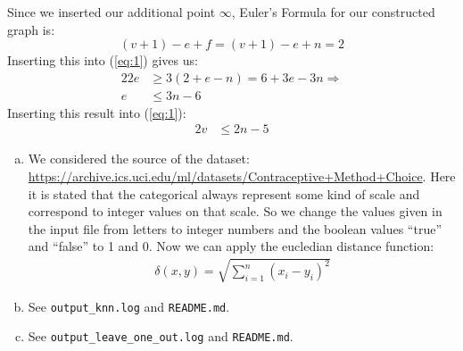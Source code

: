 \documentclass[10pt,a4paper,boxed]{hmcpset}
\begin{document}
\begin{solution}
\begin{enumerate}[(a)]
				Since we inserted our additional point $ \infty $, Euler's Formula for our constructed graph is:
				\[ (v+1)-e+f = (v+1)-e+n = 2 \]
				Inserting this into (\ref{eq:1}) gives us:
				\begin{alignat*}{2}
					2 e &\geq 3 (2 + e - n) = 6 + 3e - 3n \Rightarrow \\
					 e & \leq 3n - 6
				\end{alignat*}
				Inserting this result into (\ref{eq:1}):				
				\begin{alignat*}{2}
					v & \leq 2n - 5
				\end{alignat*}
				
									 
				
			\end{enumerate}
			
		\end{solution}		

		\begin{problem}[2. $k$-NN]
		\end{problem}
		\begin{solution}
			\begin{enumerate}[(a)]
				\item We considered the source of the dataset: 
					\url{https://archive.ics.uci.edu/ml/datasets/Contraceptive+Method+Choice}.
				Here it is stated that the categorical always
				represent some kind of scale and correspond to
				integer values on that scale. So we change the
				values given in the input file from letters to
				integer numbers and the boolean values ``true''
				and ``false'' to 1 and 0. Now we can apply the
				eucledian distance function:
				\begin{align}
					\delta (x,y) = \sqrt{ \sum_{i=1}^n (x_i-y_i)^2}
				\end{align}
			\item See \verb$output_knn.log$ and \verb$README.md$.
			\item See \verb$output_leave_one_out.log$ and \verb$README.md$.
			\end{enumerate}
		\end{solution}

		\begin{problem}		\end{problem}
\end{document}
